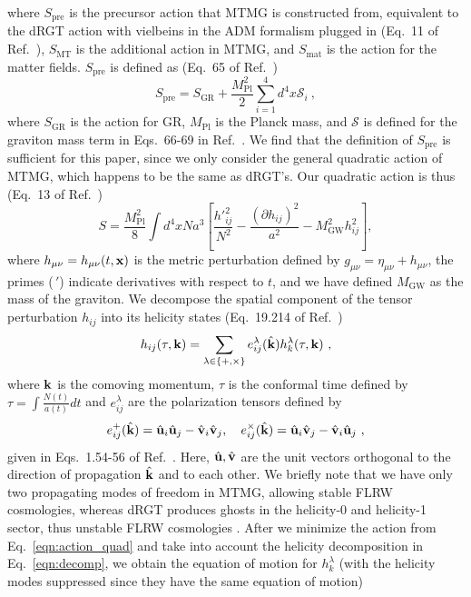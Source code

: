 \documentclass[prd,twocolumn,aps,psfig,nofootinbib,nobibnotes,superscriptaddress,preprintnumbers,times]{revtex4-2}
\begin{document}
\hspace{-1em}where $S_{\text{pre}}$ is the precursor action that MTMG is constructed from, equivalent to the dRGT action with vielbeins in the ADM formalism \cite{Arnowitt:1962hi} plugged in (Eq.\ 11 of Ref.\ \cite{DeFelice:2015moy}), $S_{\text{MT}}$ is the additional action in MTMG, and $S_{\text{mat}}$
is the action for the matter fields. $S_{\text{pre}}$ is defined as (Eq.\ 65 of Ref.\ \cite{DeFelice:2015moy})
\begin{equation} \label{eqn:action_pre}
    S_{\text{pre}} = S_{\text{GR}} + \frac{M_{\text{Pl}}^2}{2}\sum_{i=1}^4 d^4x \mathcal{S}_i\ ,
\end{equation} 
where $S_{\text{GR}}$ is the action for GR, $M_{\text{Pl}}$ is the Planck mass, and $\mathcal{S}$ is defined for the graviton mass term in Eqs.\ 66-69 in Ref.\ \cite{DeFelice:2015moy}. We find that the definition of $S_\text{pre}$ is sufficient for this paper, since we only consider the general quadratic action of MTMG, which happens to be the same as dRGT's. Our quadratic action is thus (Eq.\ 13 of Ref.\ \cite{DeFelice:2015hla})
\begin{equation} \label{eqn:action_quad}
     S = \frac{M_{\text{Pl}}^2}{8}\int d^4xNa^3\left[ \frac{h'^2_{ij}}{N^2}- \frac{(\partial h_{ij})^2}{a^2} - M_{\text{GW}}^2h_{ij}^2 \right],
\end{equation}
where $h_{\mu\nu} = h_{\mu\nu}(t,{\bf x})$ is the metric perturbation defined by $g_{\mu\nu} = \eta_{\mu\nu} + h_{\mu\nu}$, the primes ($\,'$) indicate derivatives with respect to $t$, and we have defined $M_\text{GW}$ as the mass of the graviton. We decompose the spatial component of the tensor perturbation $h_{ij}$ into its helicity states (Eq.\ 19.214 of Ref.\ \cite{Maggiore:v2}) 
\begin{equation}\label{eqn:decomp}
    h_{ij}(\tau, {\bf k}) = \sum_{\lambda \in \{+, \times\}}e^\lambda_{ij}(\hat{\bf k})h_k^\lambda(\tau, {\bf k}) \ ,
\end{equation}
where ${\bf k}$ is the comoving momentum, $\tau$ is the conformal time defined by $\tau = \int \frac{N(t)}{a(t)}dt$ and $e^\lambda_{ij}$ are the polarization tensors defined by 
\begin{equation}\label{eqn:polarization}
    e^+_{ij}(\hat{\bf k}) = \hat{\bf u}_i\hat{\bf u}_j - \hat{\bf v}_i\hat{\bf v}_j, \quad e^\times_{ij}(\hat{\bf k}) = \hat{\bf u}_i\hat{\bf v}_j - \hat{\bf v}_i\hat{\bf u}_j\ ,
\end{equation}
given in Eqs.\ 1.54-56 of Ref.\ \cite{Maggiore:v1}. Here, $\hat{\bf u}, \hat{\bf v}$ are the unit vectors orthogonal to the direction of propagation $\hat{\bf k}$ and to each other. We briefly note that we have only two propagating modes of freedom in MTMG, allowing stable FLRW cosmologies, whereas dRGT produces ghosts in the helicity-0 and helicity-1 sector, thus unstable FLRW cosmologies \cite{DeFelice:2015hla}. After we minimize the action from Eq.\ \ref{eqn:action_quad} and take into account the helicity decomposition in Eq.\ \ref{eqn:decomp}, we obtain the equation of motion for $h_k^\lambda$ (with the helicity modes suppressed since they have the same equation of motion)
\end{document}
